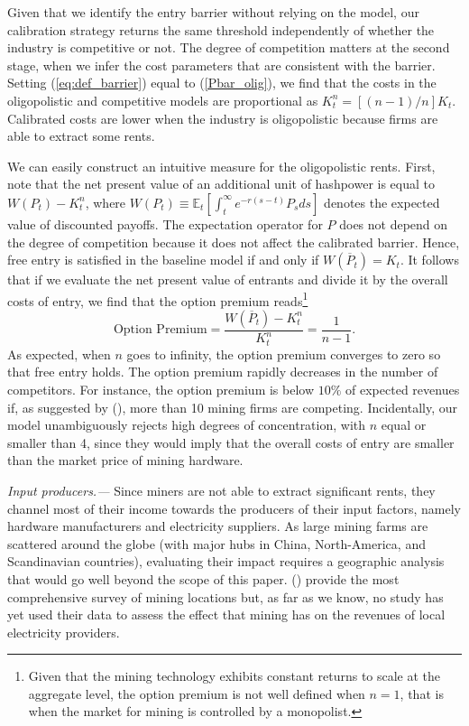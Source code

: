 \documentclass[12pt, a4paper]{article}
\begin{document}
Given that we identify the entry barrier without relying on
the model, our calibration strategy returns the same threshold independently of whether
the industry is competitive or not. The degree of competition matters at the second stage,
when we infer the cost parameters that are consistent with the barrier.
Setting (\ref{eq:def_barrier}) equal to (\ref{Pbar_olig}), we find that
the costs in the oligopolistic and competitive models are proportional as $K^n_{t}=\left[(n-1)/n\right]K_t$.
Calibrated costs are lower when the industry is oligopolistic because firms are able to extract some rents.

We can easily construct an intuitive measure for the oligopolistic rents. First, note that the net present value of an additional unit of hashpower is equal
to $W(P_t)-K^n_{t}$, where $W(P_t) \equiv \mathbb{E}_t\left[\int_{t}^{\infty }e^{-r(s-t)}P_s ds\right]$ denotes
the expected value of discounted payoffs. The expectation operator for $P$ does not depend on the degree of competition
because it does not affect the calibrated barrier. Hence, free entry is satisfied in the baseline model if and only if $W(\overline{P}_t)=K_t$.
It follows that if we evaluate the net present value of entrants and divide it by the overall costs of entry, we find that the option premium reads\footnote{Given that the mining technology exhibits constant returns to scale at the aggregate level, the option premium is not well defined when
 $n=1$, that is when the market for mining is controlled by a monopolist.}
\begin{equation*}
\text{Option Premium}=\frac{W(\overline{P}_t)-K^n_t}{K^n_t}=\frac{1}{n-1}.
\end{equation*}
As expected, when $n$ goes to infinity, the option premium converges to zero so that free entry holds. The
option premium rapidly decreases in the number of competitors. For instance, the option premium is below $10\%$ of
expected revenues if, as suggested by \citeauthor{Alsabah} (\citeyear{Alsabah}), more than 10 mining firms are
competing. Incidentally, our model unambiguously rejects high degrees of concentration, with $n$ equal or smaller than 4, since they
would imply that the overall costs of entry are smaller than the market price of mining hardware.


\emph{Input producers.---} Since miners are not able to extract significant rents,
they channel most of their income towards the producers
of their input factors, namely hardware manufacturers and electricity suppliers.
As large mining farms are scattered around the globe (with major hubs in China, North-America, and Scandinavian countries),
evaluating their impact
requires a geographic analysis that would go well beyond
the scope of this paper. \citeauthor{Pieters} (\citeyear{Pieters}) provide
the most comprehensive survey of mining locations but, as far as we know, no study has yet used their data to assess
the effect that mining has on the revenues of local electricity providers.
\end{document}
